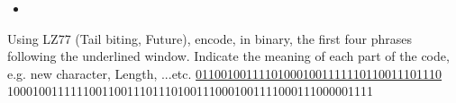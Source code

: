 \begin{solution}
\begin{enumerate}
\begin{itemize}
\item {}

\end{itemize}
\end{enumerate}
\end{solution}

\begin{question}
Using LZ77 (Tail biting, Future), encode, in binary, the first four phrases following the underlined
window. Indicate the meaning of each part of the code, e.g. new character, Length, ...etc.
\underline{011001001111010001001111110110011101110} \\
1000100111111001100111011101001110001001111000111000001111
\end{question}
